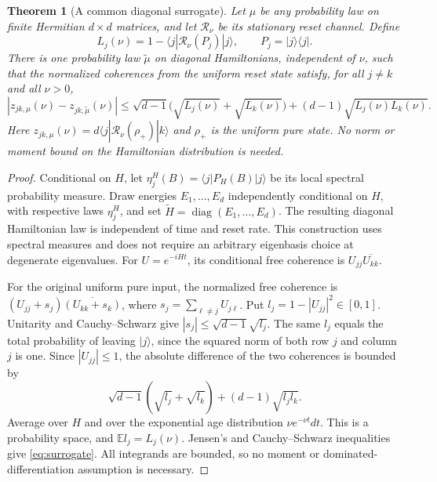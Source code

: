 \documentclass[11pt,a4paper]{article}
\newtheorem{theorem}{Theorem}
\newcommand{\E}{\mathbb E}
\newcommand{\diag}{\operatorname{diag}}
\begin{document}
\begin{theorem}[A common diagonal surrogate]\label{thm:surrogate}
Let $\mu$ be any probability law on finite Hermitian $d\times d$
matrices, and let $\mathcal R_\nu$ be its stationary reset channel.
Define
\[
 L_j(\nu)=1-\langle j|\mathcal R_\nu(P_j)|j\rangle,
 \qquad P_j=|j\rangle\langle j|.
\]
There is one probability law $\widetilde\mu$ on diagonal Hamiltonians,
independent of $\nu$, such that the normalized coherences from the
uniform reset state satisfy, for all $j\ne k$ and all $\nu>0$,
\begin{equation}\label{eq:surrogate}
 |z_{jk,\mu}(\nu)-z_{jk,\widetilde\mu}(\nu)|
 \leq \sqrt{d-1}\bigl(\sqrt{L_j(\nu)}+\sqrt{L_k(\nu)}\bigr)
 +(d-1)\sqrt{L_j(\nu)L_k(\nu)}.
\end{equation}
Here $z_{jk,\mu}(\nu)=d\langle j|\mathcal R_\nu(\rho_+)|k\rangle$
and $\rho_+$ is the uniform pure state. No norm or moment bound on
the Hamiltonian distribution is needed.
\end{theorem}
\begin{proof}
Conditional on $H$, let $\eta_j^H(B)=\langle j|P_H(B)|j\rangle$
be its local spectral probability measure. Draw energies
$E_1,\ldots,E_d$ independently conditional on $H$, with respective
laws $\eta_j^H$, and set $\widetilde H=\diag(E_1,\ldots,E_d)$.
The resulting diagonal Hamiltonian law is independent of time and
reset rate. This construction uses spectral measures and does not
require an arbitrary eigenbasis choice at degenerate eigenvalues.
For $U=e^{-iHt}$, its conditional free coherence is
$U_{jj}\overline{U_{kk}}$.

For the original uniform pure input, the normalized free coherence is
$(U_{jj}+s_j)\overline{(U_{kk}+s_k)}$, where
$s_j=\sum_{\ell\ne j}U_{j\ell}$. Put
$l_j=1-|U_{jj}|^2\in[0,1]$. Unitarity and Cauchy--Schwarz give
$|s_j|\leq\sqrt{d-1}\sqrt{l_j}$. The same $l_j$ equals the
total probability of leaving $|j\rangle$, since the squared norm
of both row $j$ and column $j$ is one.
Since $|U_{jj}|\leq1$, the absolute difference of the two coherences
is bounded by
\[
 \sqrt{d-1}(\sqrt{l_j}+\sqrt{l_k})+(d-1)\sqrt{l_jl_k}.
\]
Average over $H$ and over the exponential age distribution
$\nu e^{-\nu t}dt$. This is a probability space, and
$\E l_j=L_j(\nu)$. Jensen's and Cauchy--Schwarz inequalities
give \eqref{eq:surrogate}. All integrands are bounded, so no moment
or dominated-differentiation assumption is necessary.
\end{proof}
\end{document}
